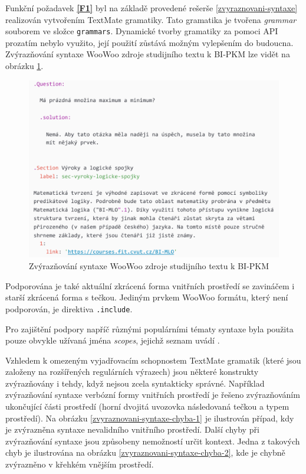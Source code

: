 Funkční požadavek \textbf{\ref{F1}} byl na základě provedené rešerše \ref{zvyraznovani-syntaxe} realizován vytvořením
TextMate gramatiky. Tato gramatika je tvořena \textit{grammar} souborem ve složce \texttt{grammars}. Dynamické
tvorby gramatiky za pomoci API prozatím nebylo využito, její použití zůstává možným vylepšením do budoucna. Zvýrazňování
syntaxe WooWoo zdroje studijního textu k BI-PKM lze vidět na obrázku \ref{zvyraznovani-syntaxe-pkm}.

\begin{figure}\centering
    \includegraphics[width=1.0\textwidth]{content/realizace/zvýrazňování-syntaxe-pkm}
 	\caption[Zvýrazňování WooWoo syntaxe]{Zvýrazňování syntaxe WooWoo zdroje studijního textu k BI-PKM \cite{pkm}}
    \label{zvyraznovani-syntaxe-pkm}
\end{figure}

Podporována je také aktuální zkrácená forma vnitřních prostředí se zavináčem i starší zkrácená forma s tečkou. Jediným
prvkem WooWoo formátu, který není podporován, je direktiva \texttt{.include}.

Pro zajištění podpory napříč různými populárními tématy syntaxe byla použita pouze obvykle užívaná jména \textit
{scopes}, jejichž seznam uvádí \cite{textmate-grammars}.

\begin{sloppypar}
Vzhledem k omezeným vyjadřovacím schopnostem TextMate gramatik (které jsou založeny na rozšířených regulárních výrazech)
jsou některé konstrukty zvýrazňovány i tehdy, když nejsou zcela syntakticky správné. Například zvýrazňování syntaxe
verbózní formy vnitřních prostředí je řešeno zvýrazňováním ukončující části prostředí (horní dvojitá uvozovka
následovaná tečkou a typem prostředí). Na obrázku \ref{zvyraznovani-syntaxe-chyba-1} je ilustrován případ, kdy je
zvýrazněna syntaxe nevalidního vnitřního prostředí. Další chyby při zvýrazňování syntaxe jsou způsobeny nemožností
určit kontext. Jedna z takových chyb je ilustrována na obrázku \ref{zvyraznovani-syntaxe-chyba-2}, kde je chybně
zvýrazněno  v křehkém vnějším prostředí.
\end{sloppypar}

